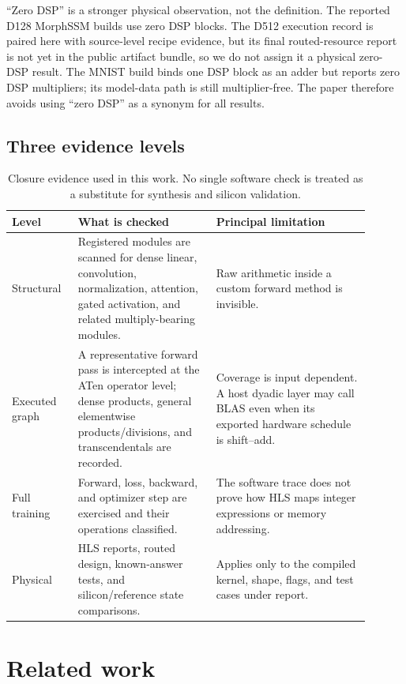 \documentclass[10pt]{article}
\begin{document}
``Zero DSP'' is a stronger physical observation, not the definition.  The
reported D128 MorphSSM builds use zero DSP blocks.  The D512 execution record is
paired here with source-level recipe evidence, but its final routed-resource
report is not yet in the public artifact bundle, so we do not assign it a
physical zero-DSP result.  The MNIST build binds one DSP block as an adder but
reports zero DSP multipliers; its model-data path is still multiplier-free.  The
paper therefore avoids using ``zero DSP'' as a synonym for all results.

\subsection{Three evidence levels}

\begin{table}[t]
\centering
\caption{Closure evidence used in this work.  No single software check is
treated as a substitute for synthesis and silicon validation.}
\label{tab:closure-levels}
\small
\begin{tabular}{p{0.16\linewidth}p{0.35\linewidth}p{0.39\linewidth}}
\toprule
Level & What is checked & Principal limitation \\
\midrule
Structural & Registered modules are scanned for dense linear, convolution,
normalization, attention, gated activation, and related multiply-bearing
modules. & Raw arithmetic inside a custom forward method is invisible. \\
Executed graph & A representative forward pass is intercepted at the ATen
operator level; dense products, general elementwise products/divisions, and
transcendentals are recorded. & Coverage is input dependent.  A host dyadic
layer may call BLAS even when its exported hardware schedule is shift--add. \\
Full training & Forward, loss, backward, and optimizer step are exercised and
their operations classified. & The software trace does not prove how HLS maps
integer expressions or memory addressing. \\
Physical & HLS reports, routed design, known-answer tests, and silicon/reference
state comparisons. & Applies only to the compiled kernel, shape, flags, and
test cases under report. \\
\bottomrule
\end{tabular}
\end{table}

\section{Related work}
\end{document}
